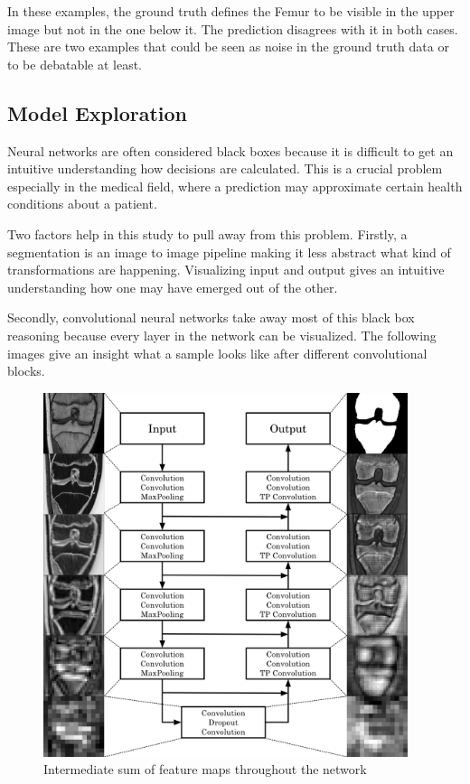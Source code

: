 In these examples, the ground truth defines the Femur to be visible in the upper image but not in the one below it. The prediction disagrees with it in both cases. These are two examples that could be seen as noise in the ground truth data or to be debatable at least.

\subsection{Model Exploration}

Neural networks are often considered black boxes because it is difficult to get an intuitive understanding how decisions are calculated. This is a crucial problem especially in the medical field, where a prediction may approximate certain health conditions about a patient.

Two factors help in this study to pull away from this problem. Firstly, a segmentation is an image to image pipeline making it less abstract what kind of transformations are happening. Visualizing input and output gives an intuitive understanding how one may have emerged out of the other.

Secondly, convolutional neural networks take away most of this black box reasoning \cite{Chollet2017} because every layer in the network can be visualized. The following images give an insight what a sample looks like after different convolutional blocks.

\begin{figure}[H]
  \centering
  \includegraphics[width=0.95\textwidth]{imgs/archi_explo.png}
\caption{Intermediate sum of feature maps throughout the network}
\end{figure}

